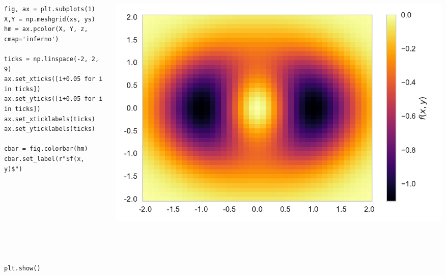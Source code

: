 \documentclass{beamer}
\begin{document}
\begin{frame}[fragile]
\tiny{
\begin{columns}
\begin{column}{0.45\textwidth}
\begin{verbatim}
fig, ax = plt.subplots(1)
X,Y = np.meshgrid(xs, ys)
hm = ax.pcolor(X, Y, z, cmap='inferno')

ticks = np.linspace(-2, 2, 9)
ax.set_xticks([i+0.05 for i in ticks])
ax.set_yticks([i+0.05 for i in ticks])
ax.set_xticklabels(ticks)
ax.set_yticklabels(ticks)

cbar = fig.colorbar(hm)
cbar.set_label(r"$f(x, y)$")









plt.show()
\end{verbatim}
\end{column}
\begin{column}{0.55\textwidth}
\includegraphics[width=\textwidth]{../heatmap_5.pdf}
\end{column}
\end{columns}
}
\end{frame}
\end{document}
